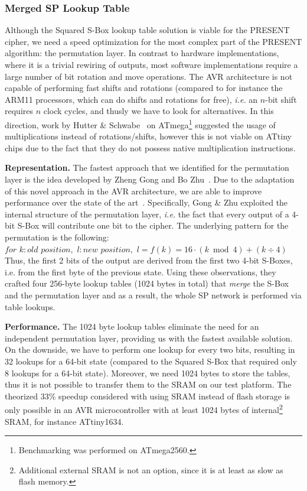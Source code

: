 \documentclass[11pt]{llncs2e} %
\begin{document}
\subsubsection{Merged SP Lookup Table}\label{msbox}
Although the Squared S-Box lookup table solution is viable for the PRESENT cipher, we need a speed optimization for the most complex part of the PRESENT algorithm: the permutation layer.
In contrast to hardware implementations, where it is a trivial rewiring of outputs, most software implementations require a large number of bit rotation and move operations.
The AVR architecture is not capable of performing fast shifts and rotations (compared to for instance the ARM11 processors, which can do shifts and rotations for free), \emph{i.e.} an $n$-bit shift requires $n$ clock cycles, and thusly we have to look for alternatives.
In this direction, work by Hutter \& Schwabe~\cite{hutternacl} on ATmega\footnote{Benchmarking was performed on ATmega2560.} suggested the usage of multiplications instead of rotations/shifts, however this is not viable on ATtiny chips due to the fact that they do not possess native multiplication instructions.

\textbf{Representation.} The fastest approach that we identified for the permutation layer is the idea developed by Zheng Gong and Bo Zhu~\cite{gong_code,gong2009towards}.
Due to the adaptation of this novel approach in the AVR architecture, we are able to improve performance over the state of the art~\cite{eisenbarth2012compact}.
Specifically, Gong \& Zhu exploited the internal structure of the permutation layer, \emph{i.e.} the fact that every output of a 4-bit S-Box will contribute one bit to the cipher.
The underlying pattern for the permutation is the following:\\

$for$ $k:old$ $position,$ $l:new$ $position,$ $l=f(k)=16 \cdot (k \bmod 4)+(k \div 4)$ \\

Thus, the first 2 bits of the output are derived from the first two 4-bit S-Boxes, i.e. from the first byte of the previous state.
Using these observations, they crafted four 256-byte lookup tables (1024 bytes in total) that \emph{merge} the S-Box and the permutation layer and as a result, the whole SP network is performed via table lookups.

\textbf{Performance.}
The 1024 byte lookup tables eliminate the need for an independent permutation layer, providing us with the fastest available solution.
On the downside, we have to perform one lookup for every two bits, resulting in 32 lookups for a 64-bit state (compared to the Squared S-Box that required only 8 lookups for a 64-bit state).
Moreover, we need 1024 bytes to store the tables, thus it is not possible to transfer them to the SRAM on our test platform.
The theorized 33\% speedup considered with using SRAM instead of flash storage is only possible in an AVR microcontroller with at least 1024 bytes of internal\footnote{Additional external SRAM is not an option, since it is at least as slow as flash memory.} SRAM, for instance ATtiny1634.
\end{document}
